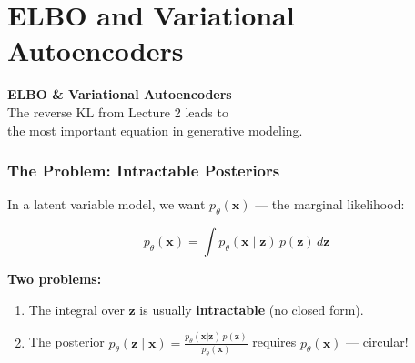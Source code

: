 \documentclass[aspectratio=169]{beamer}
\begin{document}
\section{ELBO and Variational Autoencoders}

\begin{frame}
\begin{center}
\vspace{1cm}
{\LARGE\bfseries\textcolor{popblue}{ELBO \& Variational Autoencoders}}\\[15pt]
{\large The reverse KL from Lecture 2 leads to}\\[4pt]
{\large the most important equation in generative modeling.}
\end{center}
\end{frame}

\begin{frame}
\frametitle{The Problem: Intractable Posteriors}

\small
In a latent variable model, we want $p_\theta(\mathbf{x})$ --- the marginal likelihood:

\vspace{-0.2cm}
$$p_\theta(\mathbf{x}) = \int p_\theta(\mathbf{x} \mid \mathbf{z})\, p(\mathbf{z})\, d\mathbf{z}$$

\vspace{-0.1cm}
\begin{center}
\end{center}

\vspace{0.05cm}
\textbf{Two problems:}
\begin{enumerate}\setlength{\itemsep}{1pt}
  \item The integral over $\mathbf{z}$ is usually \textbf{intractable} (no closed form).
  \item The posterior $p_\theta(\mathbf{z} \mid \mathbf{x}) = \frac{p_\theta(\mathbf{x}|\mathbf{z})\,p(\mathbf{z})}{p_\theta(\mathbf{x})}$ requires $p_\theta(\mathbf{x})$ --- circular!
\end{enumerate}

\vspace{0.1cm}
\begin{center}
\end{center}
\end{frame}
\end{document}
